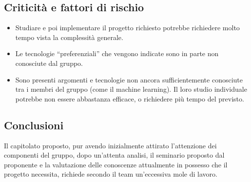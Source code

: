 \subsection{Criticità e fattori di rischio}
\begin{itemize}
    \item Studiare e poi implementare il progetto richiesto potrebbe richiedere molto tempo vista la complessità generale.
    \item Le tecnologie “preferenziali” che vengono indicate sono in parte non conosciute dal gruppo.
    \item Sono presenti argomenti e tecnologie non ancora sufficientemente conosciute tra i membri del gruppo (come il machine learning). Il loro studio individuale potrebbe non essere abbastanza efficace, o richiedere più tempo del previsto.
\end{itemize}

\subsection{Conclusioni}
Il capitolato proposto, pur avendo inizialmente attirato l'attenzione dei componenti del gruppo, dopo un'attenta analisi, il seminario proposto dal proponente e la valutazione delle conoscenze attualmente in possesso che il progetto necessita, richiede secondo il team un'eccessiva mole di lavoro.

